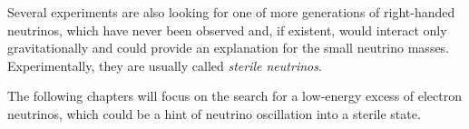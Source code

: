 Several experiments are also looking for one of more generations of right-handed neutrinos, which have never been observed and, if existent, would interact only gravitationally and could provide an explanation for the small neutrino masses. Experimentally, they are usually called \emph{sterile neutrinos}.

The following chapters will focus on the search for a low-energy excess of electron neutrinos, which could be a hint of neutrino oscillation into a sterile state. 